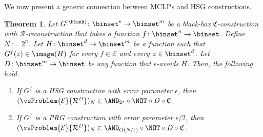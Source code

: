 \documentclass[11pt]{article}
\numberwithin{equation}{section}
\newtheorem{theorem}{Theorem}[section]
\theoremstyle{definition}
\theoremstyle{plain}
\begin{document}
%
We now present a generic connection between
MCLPs
and HSG constructions.
\begin{theorem}
  \label{thm_Generic}
  Let $G^{(\blank)} \colon \binset^s \to \binset^m$
  be a black-box $\mathfrak{C}$-construction with $\mathcal{R}$-reconstruction
  that takes a function $f \colon \binset^n \to \binset$.
  Define $N := 2^n$.
  Let $H \colon \binset^{d} \to \binset^m$ be a function such that $G^f(z) \in \image(H)$
  for every $f \in \mathcal{E}$ and every $z \in \binset^{d}$.
  Let $D \colon \binset^m \to \binset$ be any function that $\epsilon$-avoids $H$.
  Then, the following hold.
  \begin{enumerate}
    \item
          If
          $G^f$ is a HSG construction with error parameter $\epsilon$,
          then
          $(\vsProblem{\mathcal{E}}{\mathcal{R}^D})_N \in \AND_{2^s} \circ \NOT \circ D \circ \mathfrak{C}$.
    \item
          If
          $G^f$ is a PRG construction with error parameter $\epsilon / 2$,
          then
          $(\vsProblem{\mathcal{E}}{\mathcal{R}^D})_N \in \AND_{O(N/\epsilon)} \circ \NOT \circ D \circ \mathfrak{C}$.
  \end{enumerate}
\end{theorem}
\end{document}
